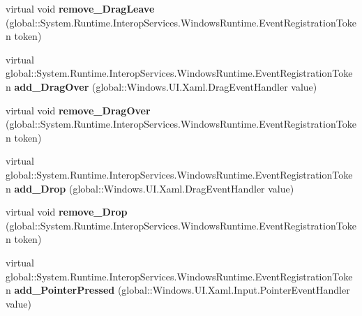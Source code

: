 \begin{DoxyCompactItemize}
\item 
\mbox{\label{class_windows_1_1_u_i_1_1_xaml_1_1_u_i_element_ad92e1bfdb1f8c87efd732bbc3fb71ab9}} 
virtual void {\bfseries remove\+\_\+\+Drag\+Leave} (global\+::\+System.\+Runtime.\+Interop\+Services.\+Windows\+Runtime.\+Event\+Registration\+Token token)
\item 
\mbox{\label{class_windows_1_1_u_i_1_1_xaml_1_1_u_i_element_ab912e89cec08f1d3a71ac840cb1a7964}} 
virtual global\+::\+System.\+Runtime.\+Interop\+Services.\+Windows\+Runtime.\+Event\+Registration\+Token {\bfseries add\+\_\+\+Drag\+Over} (global\+::\+Windows.\+U\+I.\+Xaml.\+Drag\+Event\+Handler value)
\item 
\mbox{\label{class_windows_1_1_u_i_1_1_xaml_1_1_u_i_element_a42cb32bddd90c0040c369b5317c8c3c4}} 
virtual void {\bfseries remove\+\_\+\+Drag\+Over} (global\+::\+System.\+Runtime.\+Interop\+Services.\+Windows\+Runtime.\+Event\+Registration\+Token token)
\item 
\mbox{\label{class_windows_1_1_u_i_1_1_xaml_1_1_u_i_element_aaa06508f3ebb80d04bb09db0a46cd1bf}} 
virtual global\+::\+System.\+Runtime.\+Interop\+Services.\+Windows\+Runtime.\+Event\+Registration\+Token {\bfseries add\+\_\+\+Drop} (global\+::\+Windows.\+U\+I.\+Xaml.\+Drag\+Event\+Handler value)
\item 
\mbox{\label{class_windows_1_1_u_i_1_1_xaml_1_1_u_i_element_ac2b3602dc7f654559858450b171f9b01}} 
virtual void {\bfseries remove\+\_\+\+Drop} (global\+::\+System.\+Runtime.\+Interop\+Services.\+Windows\+Runtime.\+Event\+Registration\+Token token)
\item 
\mbox{\label{class_windows_1_1_u_i_1_1_xaml_1_1_u_i_element_a06d0eec496772934d5bfec139854c34c}} 
virtual global\+::\+System.\+Runtime.\+Interop\+Services.\+Windows\+Runtime.\+Event\+Registration\+Token {\bfseries add\+\_\+\+Pointer\+Pressed} (global\+::\+Windows.\+U\+I.\+Xaml.\+Input.\+Pointer\+Event\+Handler value)
\item 
\mbox{\label{class_windows_1_1_u_i_1_1_xaml_1_1_u_i_element_a4e21b0597f1640b1294e0dc5d330e6ca}} 

\end{DoxyCompactItemize}
